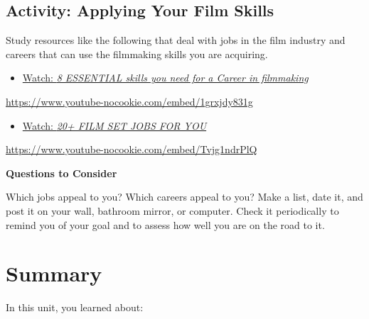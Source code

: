 \documentclass[
  letterpaper,
  DIV=11,
  numbers=noendperiod]{scrreprt}
\providecommand{\tightlist}{%
  \setlength{\itemsep}{0pt}\setlength{\parskip}{0pt}}\usepackage{longtable,booktabs,array}
\begin{document}
\subsection{Activity: Applying Your Film
Skills}\label{activity-applying-your-film-skills}

\begin{tcolorbox}[enhanced jigsaw, opacityback=0, colframe=quarto-callout-note-color-frame, leftrule=.75mm, arc=.35mm, rightrule=.15mm, colbacktitle=quarto-callout-note-color!10!white, titlerule=0mm, colback=white, toprule=.15mm, bottomtitle=1mm, breakable, toptitle=1mm, title={Learning Activity}, coltitle=black, bottomrule=.15mm, left=2mm, opacitybacktitle=0.6]

Study resources like the following that deal with jobs in the film
industry and careers that can use the filmmaking skills you are
acquiring.

\begin{itemize}
\tightlist
\item
  \href{https://www.youtube.com/watch?v=1grxjdy831g}{Watch: \emph{8
  ESSENTIAL skills you need for a Career in filmmaking}}
\end{itemize}

\url{https://www.youtube-nocookie.com/embed/1grxjdy831g}

\begin{itemize}
\tightlist
\item
  \href{https://www.youtube.com/watch?v=Tvjg1ndrPlQ}{Watch: \emph{20+
  FILM SET JOBS FOR YOU}}
\end{itemize}

\url{https://www.youtube-nocookie.com/embed/Tvjg1ndrPlQ}

\textbf{Questions to Consider}

Which jobs appeal to you? Which careers appeal to you? Make a list, date
it, and post it on your wall, bathroom mirror, or computer. Check it
periodically to remind you of your goal and to assess how well you are
on the road to it.

\end{tcolorbox}

\section*{Summary}\label{summary-9}


In this unit, you learned about:
\end{document}
